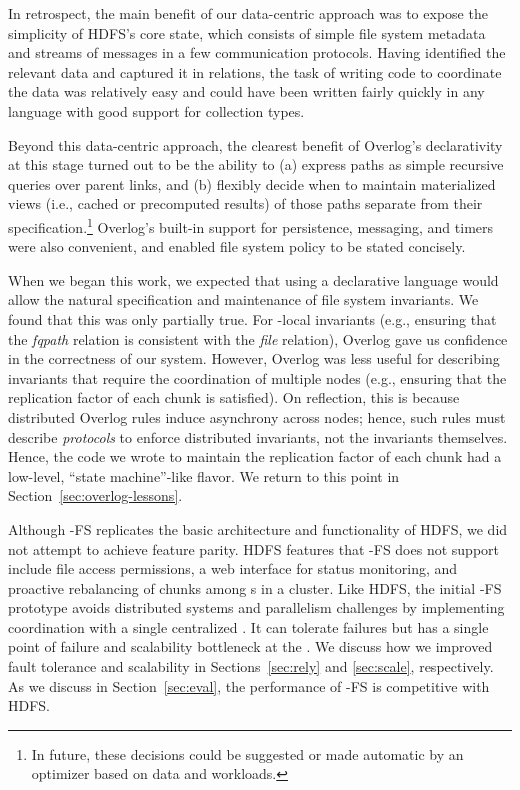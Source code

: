 In retrospect, the main benefit of our data-centric approach was to expose the
simplicity of HDFS's core state, which consists of simple file system metadata
and streams of messages in a few communication protocols.  Having identified the
relevant data and captured it in relations, the task of writing code to
coordinate the data was relatively easy and could have been written fairly
quickly in any language with good support for collection types.

Beyond this data-centric approach, the clearest benefit of Overlog's
declarativity at this stage turned out to be the ability to (a) express paths as
simple recursive queries over parent links, and (b) flexibly decide when to
maintain materialized views (i.e., cached or precomputed results) of those paths
separate from their specification.\footnote{In future, these decisions could be
  suggested or made automatic by an optimizer based on data and workloads.}
Overlog's built-in support for persistence, messaging, and timers were also
convenient, and enabled file system policy to be stated concisely.

When we began this work, we expected that using a declarative language would
allow the natural specification and maintenance of file system invariants. We
found that this was only partially true. For {\NN}-local invariants (e.g.,
ensuring that the \emph{fqpath} relation is consistent with the \emph{file}
relation), Overlog gave us confidence in the correctness of our system. However,
Overlog was less useful for describing invariants that require the coordination
of multiple nodes (e.g., ensuring that the replication factor of each chunk is
satisfied). On reflection, this is because distributed Overlog rules induce
asynchrony across nodes; hence, such rules must describe \emph{protocols} to
enforce distributed invariants, not the invariants themselves. Hence, the code
we wrote to maintain the replication factor of each chunk had a low-level,
``state machine''-like flavor. We return to this point in
Section~\ref{sec:overlog-lessons}.

Although \BOOM-FS replicates the basic architecture and functionality of HDFS,
we did not attempt to achieve feature parity.  HDFS features that \BOOM-FS does
not support include file access permissions, a web interface for status
monitoring, and proactive rebalancing of chunks among {\DN}s in a cluster. Like
HDFS, the initial \BOOM-FS prototype avoids distributed systems and parallelism
challenges by implementing coordination with a single centralized \NN.  It can
tolerate \DN failures but has a single point of failure and scalability
bottleneck at the \NN. We discuss how we improved \NN fault tolerance and
scalability in Sections~\ref{sec:rely} and \ref{sec:scale}, respectively. As we
discuss in Section~\ref{sec:eval}, the performance of \BOOM-FS is competitive
with HDFS\@.



